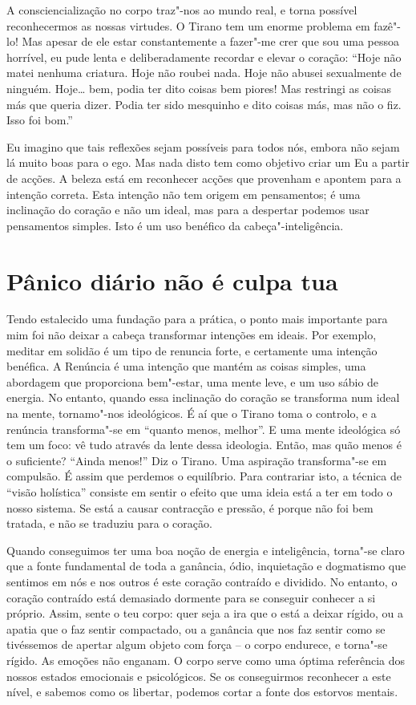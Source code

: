 \enlargethispage*{\baselineskip}

A consciencialização no corpo traz"-nos ao mundo real, e torna possível
reconhecermos as nossas virtudes. O Tirano tem um enorme problema em
fazê"-lo! Mas apesar de ele estar constantemente a fazer"-me crer que sou
uma pessoa horrível, eu pude lenta e deliberadamente recordar e elevar o
coração: “Hoje não matei nenhuma criatura. Hoje não roubei nada. Hoje
não abusei sexualmente de ninguém. Hoje\ldots{} bem, podia ter dito coisas
bem piores! Mas restringi as coisas más que queria dizer. Podia ter sido
mesquinho e dito coisas más, mas não o fiz. Isso foi bom.”

Eu imagino que tais reflexões sejam possíveis para todos nós, embora não
sejam lá muito boas para o ego. Mas nada disto tem como objetivo criar
um Eu a partir de acções. A beleza está em reconhecer acções que
provenham e apontem para a intenção correta. Esta intenção não tem
origem em pensamentos; é uma inclinação do coração e não um ideal, mas
para a despertar podemos usar pensamentos simples. Isto é um uso
benéfico da cabeça"-inteligência.

\section{Pânico diário não é culpa tua}

Tendo estalecido uma fundação para a prática, o ponto mais importante
para mim foi não deixar a cabeça transformar intenções em ideais. Por
exemplo, meditar em solidão é um tipo de renuncia forte, e certamente
uma intenção benéfica. A Renúncia é uma intenção que mantém as coisas
simples, uma abordagem que proporciona bem"-estar, uma mente leve, e um
uso sábio de energia. No entanto, quando essa inclinação do coração se
transforma num ideal na mente, tornamo"-nos ideológicos. É aí que o
Tirano toma o controlo, e a renúncia transforma"-se em “quanto menos,
melhor”. E uma mente ideológica só tem um foco: vê tudo através da lente
dessa ideologia. Então, mas quão menos é o suficiente? “Ainda menos!”
Diz o Tirano. Uma aspiração transforma"-se em compulsão. É assim que
perdemos o equilíbrio. Para contrariar isto, a técnica de “visão
holística” consiste em sentir o efeito que uma ideia está a ter em todo
o nosso sistema. Se está a causar contracção e pressão, é porque não foi
bem tratada, e não se traduziu para o coração.

Quando conseguimos ter uma boa noção de energia e inteligência, torna"-se
claro que a fonte fundamental de toda a ganância, ódio, inquietação e
dogmatismo que sentimos em nós e nos outros é este coração contraído e
dividido. No entanto, o coração contraído está demasiado dormente para
se conseguir conhecer a si próprio. Assim, sente o teu corpo: quer seja
a ira que o está a deixar rígido, ou a apatia que o faz sentir
compactado, ou a ganância que nos faz sentir como se tivéssemos de
apertar algum objeto com força -- o corpo endurece, e torna"-se rígido.
As emoções não enganam. O corpo serve como uma óptima referência dos
nossos estados emocionais e psicológicos. Se os conseguirmos reconhecer
a este nível, e sabemos como os libertar, podemos cortar a fonte dos
estorvos mentais.

